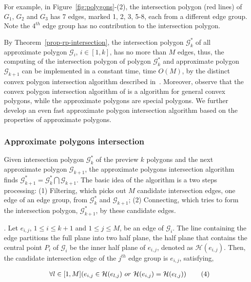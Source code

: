 For example, in Figure~\ref{fig:polygons}-(2), the intersection polygon (red lines) of $G_1$, $G_2$ and $G_3$ has 7 edges, marked 1, 2, 3, 5-8, each from a different edge group. Note the $4^{th}$ edge group has no contribution to the intersection polygon.


By Theorem~\ref{prop-rp-intersection}, the intersection polygon $\mathcal{G}^*_k$ of all approximate polygon $\mathcal{G}_i$, $i \in [1, k]$, has no more than $M$ edges, thus, the computing of the intersection polygon of polygon $\mathcal{G}^*_k$ and approximate polygon $\mathcal{G}_{k+1}$ can be implemented in a constant time, \ie time $O(M)$, by the distinct convex polygon intersection algorithm described in~\cite{ORourke:Intersection}.
%
Moreover, observe that the convex polygon intersection algorithm of \cite{ORourke:Intersection} is a algorithm for general convex polygons, while the approximate polygons are special polygons. We further develop an even fast approximate polygon intersection algorithm based on the properties of approximate polygons.

\subsubsection{Approximate polygons intersection}
Given intersection polygon $\mathcal{G}^*_k$ of the preview $k$ polygons and the next approximate polygon $\mathcal{G}_{k+1}$, the approximate polygons intersection algorithm finds $\mathcal{G}^*_{k+1} = \mathcal{G}^*_k  \bigcap \mathcal{G}_{k+1}$. The basic idea of the algorithm is a two steps processing:
 (1) Filtering, which picks out $M$ candidate intersection edges, one edge of an edge group, from $\mathcal{G}^*_k $ and $\mathcal{G}_{k+1}$;
 (2) Connecting, which tries to form the intersection polygon, \ie $\mathcal{G}^*_{k+1}$, by these candidate edges.

.
Let $e_{i,j}$, $1 \le i \le k+1$ and $1 \le j \le M$, be an edge of $\mathcal{G}_{i}$. The line containing the edge partitions the full plane into two half plane, the half plane that contains the central point $P_i$ of $\mathcal{G}_i$ be the inner half plane of $e_{i,j}$, denoted as $\mathcal{H}(e_{i,j})$.
%
Then, the candidate intersection edge of the $j^{th}$ edge group is $e_{i,j}$, satisfying,

\vspace{-2ex}
\begin{equation*}
\label{equ-inter-edge}
    \begin{aligned}
        \hspace{2ex}  \forall l \in [1, M] (e_{i,j} \in \mathcal{H}(e_{l,j}) ~or~ \mathcal{H}(e_{i,j}) = \mathcal{H}(e_{l,j}) )    \hspace{5ex} (4)\\
    \end{aligned}
\end{equation*}
\vspace{-2ex}

